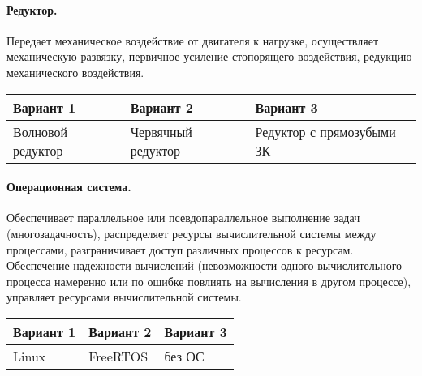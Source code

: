 \paragraph{Редуктор.}
Передает механическое воздействие от двигателя к
нагрузке, осуществляет механическую развязку, первичное усиление
стопорящего воздействия, редукцию механического воздействия.

\begin{tabular}{|p{5cm}|p{5cm}|p{5cm}|}
    \hline
    Вариант 1 & Вариант 2 & Вариант 3 \\
    \hline
    Волновой редуктор &
    Червячный редуктор &
    Редуктор с прямозубыми ЗК \\
    \hline
\end{tabular}

\paragraph{Операционная система.}
Обеспечивает параллельное или псевдопараллельное
выполнение задач (многозадачность), распределяет ресурсы вычислительной
системы между процессами, разграничивает доступ различных процессов к
ресурсам. Обеспечение надежности вычислений (невозможности одного
вычислительного процесса намеренно или по ошибке повлиять на вычисления
в другом процессе), управляет ресурсами вычислительной системы.

\begin{tabular}{|p{5cm}|p{5cm}|p{5cm}|}
    \hline
    Вариант 1 & Вариант 2 & Вариант 3 \\
    \hline
    Linux &
    FreeRTOS &
    без ОС \\
    \hline
\end{tabular}


